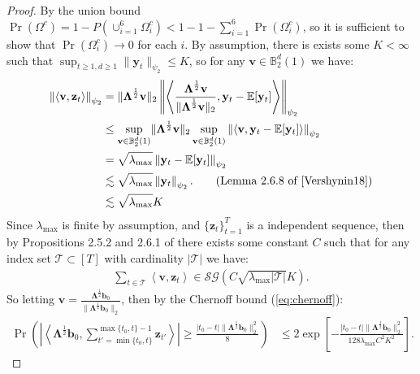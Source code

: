 \begin{proof}

By the union bound $\Pr(\Omega^c) = 1 - P(\cup_{i=1}^6 \Omega^c_i) < 1 - 1 - \sum_{i=1}^6 \Pr(\Omega^c_i)$, so it is sufficient to show that $\Pr(\Omega^c_i) \to 0$ for each $i$. By assumption, there is exists some $K < \infty$ such that $\sup_{t\geq 1, d\geq 1} \lVert \mathbf{y}_t\rVert_{\psi_2} \leq K$, so for any $\mathbf{v} \in \mathbb{B}^d_2(1)$ we have:
\begin{align*}
    \left\lVert\left\langle\mathbf{v}, \mathbf{z}_t \right\rangle\right\rVert_{\psi_2} &= \lVert \boldsymbol{\Lambda}^{\frac{1}{2}}\mathbf{v}\rVert_{2}\left\lVert\left\langle\frac{\boldsymbol{\Lambda}^{\frac{1}{2}}\mathbf{v}}{\lVert \boldsymbol{\Lambda}^{\frac{1}{2}}\mathbf{v} \rVert_2}, \mathbf{y}_t - \E[\mathbf{y}_t] \right\rangle\right\rVert_{\psi_2} \\
    &\leq \sup_{\mathbf{v} \in  \mathbb{B}^d_2(1)}\lVert\boldsymbol{\Lambda}^{\frac{1}{2}}\mathbf{v}\rVert_{2} \sup_{\mathbf{v} \in  \mathbb{B}^d_2(1)} \left\lVert\left\langle\mathbf{v}, \mathbf{y}_t - \E[\mathbf{y}_t] \right\rangle\right\rVert_{\psi_2}\\
    &= \sqrt{\lambda_{\max}} \left\lVert\mathbf{y}_t - \E[\mathbf{y}_t] \right\rVert_{\psi_2} \\
    &\lesssim \sqrt{\lambda_{\max}} \left\lVert\mathbf{y}_t \right\rVert_{\psi_2}. \tag{Lemma 2.6.8 of \cite{Vershynin18}} \\
    &\lesssim \sqrt{\lambda_{\max}} K
\end{align*}
Since $\lambda_{\max}$ is finite by assumption, and $\{\mathbf{z}_t\}_{t=1}^T$ is a independent sequence, then by Propositions 2.5.2 and 2.6.1 of \cite{Vershynin18} there exists some constant $C$ such that for any index set $\mathcal{T} \subset [T]$ with cardinality $|\mathcal{T}|$ we have: 
\begin{align*}
    \sum_{t \in \mathcal{T}} \left\langle\mathbf{v}, \mathbf{z}_t \right\rangle \in \mathcal{SG}\left(C\sqrt{\lambda_{\max}|\mathcal{T}|} K\right).
\end{align*}
So letting $\mathbf{v} = \frac{\boldsymbol{\Lambda}^{\frac{1}{2}}\mathbf{b}_0}{\lVert \boldsymbol{\Lambda}^{\frac{1}{2}}\mathbf{b}_0 \rVert_2}$, then by the Chernoff bound (\ref{eq:chernoff}): 
\begin{align*}
    \Pr\left(\left|\left\langle\boldsymbol{\Lambda}^{\frac{1}{2}}\mathbf{b}_0, \sum_{t'=\min\{t_0,t\}}^{\max\{t_0,t\}-1}\mathbf{z}_{t'} \right\rangle\right| \geq \frac{|t_0-t| \lVert\boldsymbol{\Lambda}^{\frac{1}{2}} \mathbf{b}_0\rVert_2^2}{8}\right) &\leq 2\exp\left[-\frac{|t_0-t|\lVert\boldsymbol{\Lambda}^{\frac{1}{2}} \mathbf{b}_0\rVert^2_2}{128\lambda_{\max}C^2K^2}\right].

\end{align*}
\end{proof}
